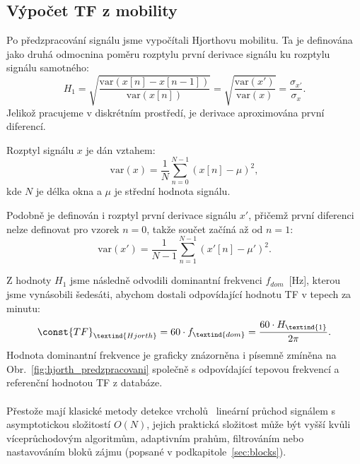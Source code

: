 \subsection*{Výpočet TF z mobility}
\label{sec:TF_mobilita}
Po předzpracování signálu jsme vypočítali Hjorthovu mobilitu.
Ta je definována~\cite{Hjorth1970,Geetika2022} jako druhá odmocnina poměru rozptylu první derivace signálu ku rozptylu signálu samotného:
\begin{equation}
	\label{eq:hjorth_mobility}
	H_1 = \sqrt{ \frac{ \mathrm{var}(x[n] - x[n-1]) }{ \mathrm{var}(x[n]) } }
	= \sqrt{ \frac{ \mathrm{var}(x') }{ \mathrm{var}(x) } }
	= \frac{ \sigma_{x'} }{ \sigma_{x} }.
\end{equation}
Jelikož pracujeme v diskrétním prostředí, je derivace aproximována první diferencí.

Rozptyl signálu \( x \) je dán vztahem:
\begin{equation}
	\label{eq:hjorth_var_signal}
	\mathrm{var}(x) = \frac{1}{N} \sum_{n=0}^{N-1} (x[n] - \mu)^2,
\end{equation}
kde \( N \) je délka okna a \( \mu \) je střední hodnota signálu.

Podobně je definován i rozptyl první derivace signálu \( x' \), přičemž první diferenci nelze definovat pro vzorek \( n = 0 \), takže součet začíná až od \( n = 1 \):
\begin{equation}
	\label{eq:hjorth_var_signal_diff}
	\mathrm{var}(x') = \frac{1}{N - 1} \sum_{n=1}^{N-1} (x'[n] - \mu')^2.
\end{equation}

Z hodnoty \( H_1 \) jsme následně odvodili dominantní frekvenci \( f_{dom} \)~[Hz], kterou jsme vynásobili šedesáti, abychom dostali odpovídající hodnotu \acs{TF} v tepech za minutu:
\begin{equation}
	\const{TF}_{\textind{Hjorth}} = 60 \cdot f_{\textind{dom}} = \frac{60 \cdot H_{\textind{1}}}{2\pi}.
\end{equation}
Hodnota dominantní frekvence je graficky znázorněna i písemně zmíněna na Obr.~\ref{fig:hjorth_predzpracovani} společně s odpovídající tepovou frekvencí a referenční hodnotou \acs{TF} z databáze.

\paragraph{}
Přestože mají klasické metody detekce vrcholů~\cite{Elgendi2013} lineární průchod signálem s asymptotickou složitostí \( O(N) \), jejich praktická složitost může být vyšší kvůli víceprůchodovým algoritmům, adaptivním prahům, filtrováním nebo nastavováním bloků zájmu (popsané v podkapitole~\ref{sec:blocks}).


